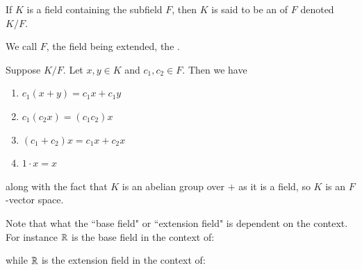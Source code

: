\documentclass[12pt, a4paper, oneside, openright, titlepage]{book}
\begin{document}
\begin{defn}
    If $K$ is a field containing the subfield $F$, then $K$ is said to be an  of $F$ denoted $K/F$.
        \begin{center}
        \end{center}
    We call $F$, the field being extended, the .
\end{defn}

\begin{rmk}
    Suppose $K/F$. Let $x,y \in K$ and $c_1,c_2 \in F$. Then we have \begin{enumerate}
        \item $c_1(x+y) = c_1x+c_1y$
        \item $c_1(c_2x) = (c_1c_2)x$
        \item $(c_1+c_2)x = c_1x+c_2x$
        \item $1\cdot x = x$
    \end{enumerate}
    along with the fact that $K$ is an abelian group over $+$ as it is a field, so $K$ is an $F$-vector space.
\end{rmk}

Note that what the ``base field" or ``extension field" is dependent on the context. For instance $\mathbb R$ is the base field in the context of:
\begin{center}
\end{center}
while $\mathbb R$ is the extension field in the context of:
\begin{center}
\end{center}
\end{document}

